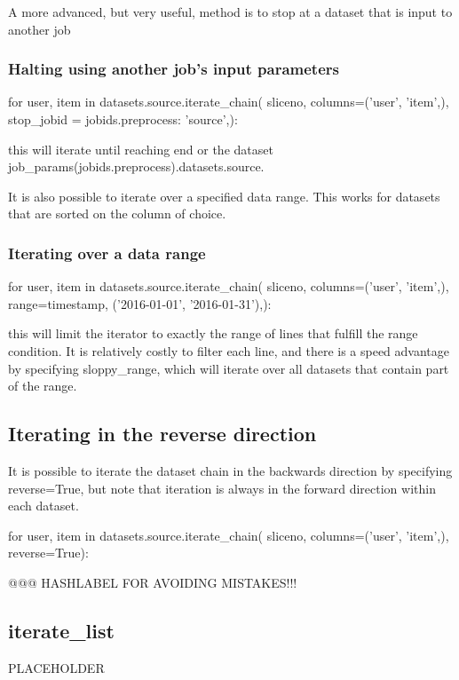 A more advanced, but very useful, method is to stop at a dataset that
is input to another job

\subsubsection*{Halting using another job's input parameters}
\begin{python}
for user, item in datasets.source.iterate_chain(
    sliceno,
    columns=('user', 'item',),
    stop_jobid = {jobids.preprocess: 'source',}):
\end{python}
this will iterate until reaching end or the dataset
job\_params(jobids.preprocess).datasets.source.

It is also possible to iterate over a specified data range.  This
works for datasets that are sorted on the column of choice.

\subsubsection*{Iterating over a data range}
\begin{python}
for user, item in datasets.source.iterate_chain(
    sliceno,
    columns=('user', 'item',),
    range={timestamp, ('2016-01-01', '2016-01-31'),}):
\end{python}
this will limit the iterator to exactly the range of lines that
fulfill the range condition.  It is relatively costly to filter each
line, and there is a speed advantage by specifying sloppy\_range,
which will iterate over all datasets that contain part of the range.

\subsection{Iterating in the reverse direction}

It is possible to iterate the dataset chain in the backwards direction
by specifying reverse=True, but note that iteration is always in the
forward direction within each dataset.

\begin{python}
for user, item in datasets.source.iterate_chain(
    sliceno,
    columns=('user', 'item',),
    reverse=True):
\end{python}

@@@ HASHLABEL FOR AVOIDING MISTAKES!!!

\subsection{iterate\_list}
PLACEHOLDER


